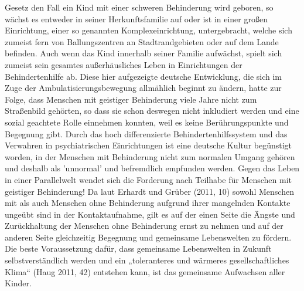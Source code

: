 Gesetz den Fall ein Kind mit einer schweren Behinderung wird geboren, so wächst es entweder in seiner Herkunftsfamilie auf oder ist in einer großen Einrichtung, einer so genannten Komplexeinrichtung, untergebracht, welche sich zumeist fern von Ballungszentren an Stadtrandgebieten oder auf dem Lande befinden. Auch wenn das Kind  innerhalb seiner Familie aufwächst, spielt sich zumeist sein gesamtes außerhäusliches Leben in Einrichtungen der Behindertenhilfe ab. Diese hier aufgezeigte deutsche Entwicklung, die sich im Zuge der Ambulatisierungsbewegung allmählich beginnt zu ändern, hatte zur Folge, dass Menschen mit geistiger Behinderung viele Jahre nicht zum Straßenbild gehörten, so dass sie schon deswegen nicht inkludiert werden und eine sozial geachtete Rolle einnehmen konnten, weil es keine Berührungspunkte und Begegnung gibt. Durch das hoch differenzierte Behindertenhilfssystem und das Verwahren in psychiatrischen Einrichtungen ist eine deutsche Kultur begünstigt worden, in der Menschen mit Behinderung nicht zum normalen Umgang gehören und deshalb als 'unnormal' und befremdlich empfunden werden. Gegen das Leben in einer Parallelwelt wendet sich die Forderung nach Teilhabe für Menschen mit geistiger Behinderung! 
Da laut Erhardt und Grüber (2011, 10) sowohl Menschen mit als auch Menschen ohne Behinderung aufgrund ihrer mangelnden Kontakte ungeübt sind in der Kontaktaufnahme, gilt es auf der einen Seite die Ängste und Zurückhaltung der Menschen ohne Behinderung ernst zu nehmen und auf der anderen Seite gleichzeitig Begegnung und gemeinsame Lebenswelten zu fördern. Die beste Voraussetzung dafür, dass gemeinsame Lebenswelten in Zukunft selbstverständlich werden und ein „toleranteres und wärmeres gesellschaftliches Klima“ (Haug 2011, 42) entstehen kann, ist das gemeinsame Aufwachsen aller Kinder. 

